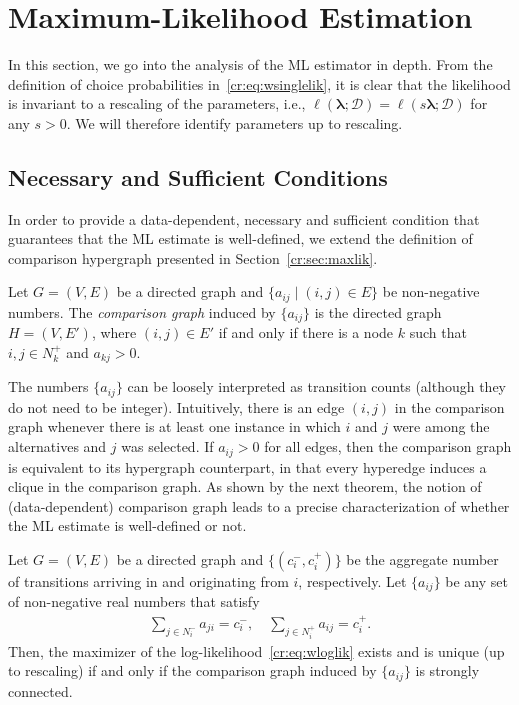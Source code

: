\section{Maximum-Likelihood Estimation}  %
\label{cr:app:maxlik}

In this section, we go into the analysis of the ML estimator in depth.
From the definition of choice probabilities in~\eqref{cr:eq:wsinglelik}, it is clear that the likelihood is invariant to a rescaling of the parameters, i.e., $\ell(\bm{\lambda}; \mathcal{D}) = \ell(s \bm{\lambda}; \mathcal{D})$ for any $s > 0$.
We will therefore identify parameters up to rescaling.

\subsection{Necessary and Sufficient Conditions}

In order to provide a data-dependent, necessary and sufficient condition that guarantees that the ML estimate is well-defined, we extend the definition of comparison hypergraph presented in Section~\ref{cr:sec:maxlik}.

\begin{definition}
Let $G = (V, E)$ be a directed graph and $\{ a_{ij} \mid (i,j) \in E \}$ be non-negative numbers.
The \emph{comparison graph} induced by $\{ a_{ij} \}$ is the directed graph $H = (V, E')$, where $(i,j) \in E'$ if and only if there is a node $k$ such that $i, j \in N^+_k$ and $a_{kj} > 0$.
\end{definition}

The numbers $\{ a_{ij}\}$ can be loosely interpreted as transition counts (although they do not need to be integer).
Intuitively, there is an edge $(i, j)$ in the comparison graph whenever there is at least one instance in which $i$ and $j$ were among the alternatives and $j$ was selected.
If $a_{ij} > 0$ for all edges, then the comparison graph is equivalent to its hypergraph counterpart, in that every hyperedge induces a clique in the comparison graph.
As shown by the next theorem, the notion of (data-dependent) comparison graph leads to a precise characterization of whether the ML estimate is well-defined or not.

\begin{theorem}
\label{cr:thm:mlboth}
Let $G = (V, E)$ be a directed graph and $\{ (c^-_i, c^+_i) \}$ be the aggregate number of transitions arriving in and originating from $i$, respectively.
Let $\{ a_{ij} \}$ be any set of non-negative real numbers that satisfy
\begin{align*}
\sum_{j \in N^-_i} a_{ji} = c^-_i, \quad
\sum_{j \in N^+_i} a_{ij} = c^+_i.
\end{align*}
Then, the maximizer of the log-likelihood~\eqref{cr:eq:wloglik} exists and is unique (up to rescaling) if and only if the comparison graph induced by $\{ a_{ij} \}$ is strongly connected.
\end{theorem}

